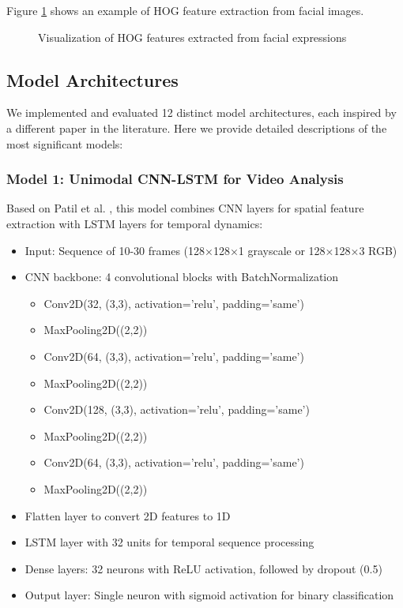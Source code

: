 \documentclass[conference,compsoc]{IEEEtran}
\begin{document}
Figure \ref{fig:hog_features} shows an example of HOG feature extraction from facial images.

\begin{figure}[htbp]
\centering
\begin{minipage}{0.8\textwidth}
\end{minipage}
\caption{Visualization of HOG features extracted from facial expressions}
\label{fig:hog_features}
\end{figure}

\subsection{Model Architectures}
We implemented and evaluated 12 distinct model architectures, each inspired by a different paper in the literature. Here we provide detailed descriptions of the most significant models:

\subsubsection{Model 1: Unimodal CNN-LSTM for Video Analysis}
Based on Patil et al. \cite{patil2023}, this model combines CNN layers for spatial feature extraction with LSTM layers for temporal dynamics:
\begin{itemize}
    \item Input: Sequence of 10-30 frames (128×128×1 grayscale or 128×128×3 RGB)
    \item CNN backbone: 4 convolutional blocks with BatchNormalization
        \begin{itemize}
            \item Conv2D(32, (3,3), activation='relu', padding='same')
            \item MaxPooling2D((2,2))
            \item Conv2D(64, (3,3), activation='relu', padding='same')
            \item MaxPooling2D((2,2))
            \item Conv2D(128, (3,3), activation='relu', padding='same')
            \item MaxPooling2D((2,2))
            \item Conv2D(64, (3,3), activation='relu', padding='same')
            \item MaxPooling2D((2,2))
        \end{itemize}
    \item Flatten layer to convert 2D features to 1D
    \item LSTM layer with 32 units for temporal sequence processing
    \item Dense layers: 32 neurons with ReLU activation, followed by dropout (0.5)
    \item Output layer: Single neuron with sigmoid activation for binary classification
\end{itemize}
\end{document}
